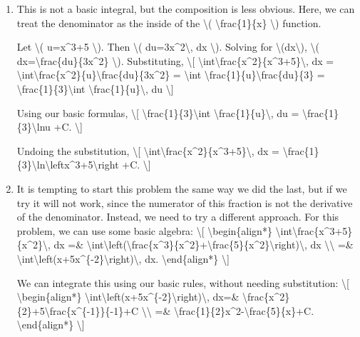 \begin{enumerate}
\item
  This is not a basic integral, but the composition is less obvious.
  Here, we can treat the denominator as the inside of the
  \textbackslash{}( \textbackslash{}frac\{1\}\{x\} \textbackslash{})
  function.

  Let \textbackslash{}( u=x\^{}3+5 \textbackslash{}). Then
  \textbackslash{}( du=3x\^{}2\textbackslash{}, dx \textbackslash{}).
  Solving for \textbackslash{}(dx\textbackslash{}), \textbackslash{}(
  dx=\textbackslash{}frac\{du\}\{3x\^{}2\} \textbackslash{}).
  Substituting, \textbackslash{}{[}
  \textbackslash{}int\textbackslash{}frac\{x\^{}2\}\{x\^{}3+5\}\textbackslash{},
  dx =
  \textbackslash{}int\textbackslash{}frac\{x\^{}2\}\{u\}\textbackslash{}frac\{du\}\{3x\^{}2\}
  = \textbackslash{}int
  \textbackslash{}frac\{1\}\{u\}\textbackslash{}frac\{du\}\{3\} =
  \textbackslash{}frac\{1\}\{3\}\textbackslash{}int
  \textbackslash{}frac\{1\}\{u\}\textbackslash{}, du \textbackslash{}{]}

  Using our basic formulas, \textbackslash{}{[}
  \textbackslash{}frac\{1\}\{3\}\textbackslash{}int
  \textbackslash{}frac\{1\}\{u\}\textbackslash{}, du =
  \textbackslash{}frac\{1\}\{3\}\textbackslash{}ln\textbar{}u\textbar{}
  +C. \textbackslash{}{]}

  Undoing the substitution, \textbackslash{}{[}
  \textbackslash{}int\textbackslash{}frac\{x\^{}2\}\{x\^{}3+5\}\textbackslash{},
  dx =
  \textbackslash{}frac\{1\}\{3\}\textbackslash{}ln\textbackslash{}left\textbar{}x\^{}3+5\textbackslash{}right\textbar{}
  +C. \textbackslash{}{]}
\item
  It is tempting to start this problem the same way we did the last, but
  if we try it will not work, since the numerator of this fraction is
  not the derivative of the denominator. Instead, we need to try a
  different approach. For this problem, we can use some basic algebra:
  \textbackslash{}{[} \textbackslash{}begin\{align*\}
  \textbackslash{}int\textbackslash{}frac\{x\^{}3+5\}\{x\^{}2\}\textbackslash{},
  dx =\&
  \textbackslash{}int\textbackslash{}left(\textbackslash{}frac\{x\^{}3\}\{x\^{}2\}+\textbackslash{}frac\{5\}\{x\^{}2\}\textbackslash{}right)\textbackslash{},
  dx \textbackslash{}\textbackslash{} =\&
  \textbackslash{}int\textbackslash{}left(x+5x\^{}\{-2\}\textbackslash{}right)\textbackslash{},
  dx. \textbackslash{}end\{align*\} \textbackslash{}{]}

  We can integrate this using our basic rules, without needing
  substitution: \textbackslash{}{[} \textbackslash{}begin\{align*\}
  \textbackslash{}int\textbackslash{}left(x+5x\^{}\{-2\}\textbackslash{}right)\textbackslash{},
  dx=\&
  \textbackslash{}frac\{x\^{}2\}\{2\}+5\textbackslash{}frac\{x\^{}\{-1\}\}\{-1\}+C
  \textbackslash{}\textbackslash{} =\&
  \textbackslash{}frac\{1\}\{2\}x\^{}2-\textbackslash{}frac\{5\}\{x\}+C.
  \textbackslash{}end\{align*\} \textbackslash{}{]}
\end{enumerate}

